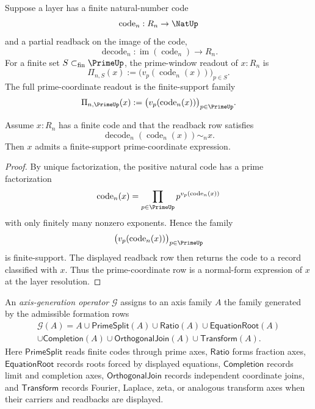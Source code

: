 \begin{definition}
\label{def:finite-code-prime-window}
Suppose a layer has a finite natural-number code
$$
\operatorname{code}_n:R_n\to\NatUp
$$
and a partial readback on the image of the code,
$$
\operatorname{decode}_n:\operatorname{im}(\operatorname{code}_n)\to R_n.
$$
For a finite set $S\subset_{\mathrm{fin}}\PrimeUp$, the prime-window
readout of $x:R_n$ is
$$
\Pi_{n,S}(x)
:=
\bigl(v_p(\operatorname{code}_n(x))\bigr)_{p\in S}.
$$
The full prime-coordinate readout is the finite-support family
$$
\Pi_{n,\PrimeUp}(x)
:=
\bigl(v_p(\operatorname{code}_n(x))\bigr)_{p\in\PrimeUp}.
$$
\end{definition}

\begin{theorem}
\label{thm:finite-codes-prime-coordinate-normal-forms}
Assume $x:R_n$ has a finite code and that the readback row satisfies
$$
\operatorname{decode}_n(\operatorname{code}_n(x))\sim_n x.
$$
Then $x$ admits a finite-support prime-coordinate expression.
\end{theorem}

\begin{proof}
By unique factorization, the positive natural code has a prime
factorization
$$
\operatorname{code}_n(x)
=
\prod_{p\in\PrimeUp}
p^{v_p(\operatorname{code}_n(x))}
$$
with only finitely many nonzero exponents. Hence the family
$$
\bigl(v_p(\operatorname{code}_n(x))\bigr)_{p\in\PrimeUp}
$$
is finite-support. The displayed readback row then returns the code to a
record classified with $x$. Thus the prime-coordinate row is a
normal-form expression of $x$ at the layer resolution.
\end{proof}

\begin{definition}
\label{def:axis-generation-operator}
An \emph{axis-generation operator} $\mathcal G$ assigns to an axis
family $A$ the family generated by the admissible formation rows
$$
\begin{gathered}
\mathcal G(A)
=
A
\cup
\mathsf{PrimeSplit}(A)
\cup
\mathsf{Ratio}(A)
\cup
\mathsf{EquationRoot}(A)\\
\cup
\mathsf{Completion}(A)
\cup
\mathsf{OrthogonalJoin}(A)
\cup
\mathsf{Transform}(A).
\end{gathered}
$$
Here $\mathsf{PrimeSplit}$ reads finite codes through prime axes,
$\mathsf{Ratio}$ forms fraction axes, $\mathsf{EquationRoot}$ records
roots forced by displayed equations, $\mathsf{Completion}$ records
limit and completion axes, $\mathsf{OrthogonalJoin}$ records independent
coordinate joins, and $\mathsf{Transform}$ records Fourier, Laplace,
zeta, or analogous transform axes when their carriers and readbacks are
displayed.
\end{definition}

